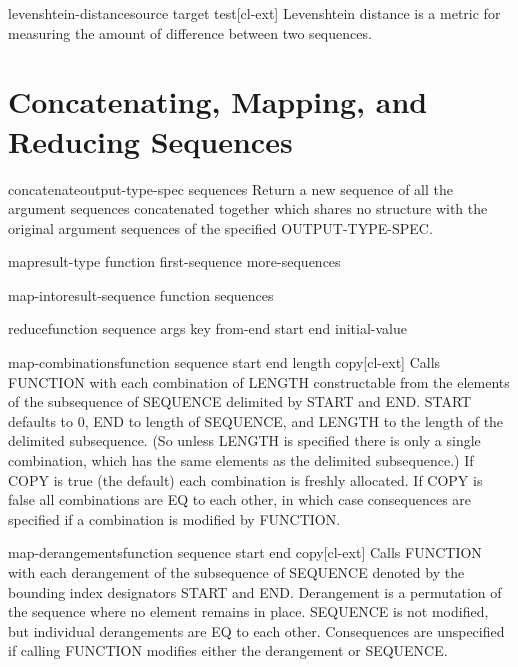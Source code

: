\documentclass[10pt,english]{book}
\begin{document}
\begin{function}{levenshtein-distance}{source target \key test}[cl-ext]
  Levenshtein distance is a metric for measuring the amount of
  difference between two sequences.
\end{function}

\section{Concatenating, Mapping, and Reducing Sequences}
\label{sec:conc-mapp-reduc}

\begin{function}{concatenate}{output-type-spec \rest sequences}
  Return a new sequence of all the argument sequences concatenated together
  which shares no structure with the original argument sequences of the
  specified OUTPUT-TYPE-SPEC.
\end{function}

\begin{function}{map}{result-type function first-sequence \rest more-sequences}
  
\end{function}

\begin{function}{map-into}{result-sequence function \rest sequences}
  
\end{function}

\begin{function}{reduce}{function sequence \rest args \key key from-end start end initial-value}
  
\end{function}

\begin{function}{map-combinations}{function sequence \key start end length copy}[cl-ext]
  Calls FUNCTION with each combination of LENGTH constructable from the
  elements of the subsequence of SEQUENCE delimited by START and END. START
  defaults to 0, END to length of SEQUENCE, and LENGTH to the length of the
  delimited subsequence. (So unless LENGTH is specified there is only a single
  combination, which has the same elements as the delimited subsequence.) If
  COPY is true (the default) each combination is freshly allocated. If COPY is
  false all combinations are EQ to each other, in which case consequences are
  specified if a combination is modified by FUNCTION.
\end{function}

\begin{function}{map-derangements}{function sequence \key start end copy}[cl-ext]
  Calls FUNCTION with each derangement of the subsequence of SEQUENCE denoted
  by the bounding index designators START and END. Derangement is a permutation
  of the sequence where no element remains in place. SEQUENCE is not modified,
  but individual derangements are EQ to each other. Consequences are unspecified
  if calling FUNCTION modifies either the derangement or SEQUENCE.
\end{function}
\end{document}
